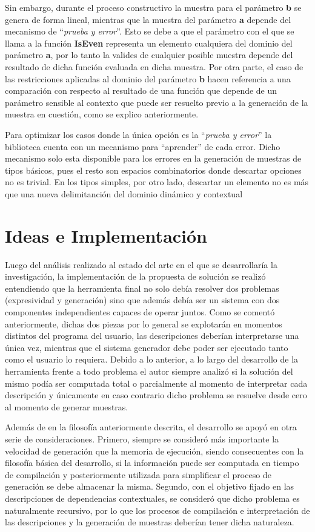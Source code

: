 Sin embargo, durante el proceso constructivo la muestra para el parámetro {\bf b} se genera de forma lineal, mientras que la
muestra del parámetro {\bf a} depende del mecanismo de “{\it prueba y error}”. Esto se debe a que el parámetro con el que se llama
a la función {\bf IsEven} representa un elemento cualquiera del dominio del parámetro {\bf a}, por lo tanto la valides de cualquier
posible muestra depende del resultado de dicha función evaluada en dicha muestra. Por otra parte, el caso de las
restricciones aplicadas al dominio del parámetro {\bf b} hacen referencia a una comparación con respecto al resultado de una
función que depende de un parámetro sensible al contexto que puede ser resuelto previo a la generación de la muestra en
cuestión, como se explico anteriormente.

Para optimizar los casos donde la única opción es la “{\it prueba y error}” la biblioteca cuenta con un mecanismo para “aprender”
de cada error. Dicho mecanismo solo esta disponible para los errores en la generación de muestras de tipos básicos, pues el
resto son espacios combinatorios donde descartar opciones no es trivial. En los tipos simples, por otro lado, descartar un
elemento no es más que una nueva delimitanción del dominio dinámico y contextual

\section{Ideas e Implementación}


Luego del análisis realizado al estado del arte en el que se desarrollaría la investigación, la implementación de
la propuesta de solución se realizó entendiendo que la herramienta final no solo debía resolver dos problemas
(expresividad y generación) sino que además debía ser un sistema con dos componentes independientes capaces de
operar juntos. Como se comentó anteriormente, dichas dos piezas por lo general se explotarán en momentos distintos
del programa del usuario, las descripciones deberían interpretarse una única vez, mientras que el sistema generador
debe poder ser ejecutado tanto como el usuario lo requiera. Debido a lo anterior, a lo largo del desarrollo de la
herramienta frente a todo problema el autor siempre analizó si la solución del mismo podía ser computada total o
parcialmente al momento de interpretar cada descripción y únicamente en caso contrario dicho problema se resuelve desde
cero al momento de generar muestras.



Además de en la filosofía anteriormente descrita, el desarrollo se apoyó en otra serie de consideraciones.
Primero, siempre se consideró más importante la velocidad de generación que la memoria de ejecución, siendo 
consecuentes con la filosofía básica del desarrollo, si la información puede ser computada en tiempo de compilación y
posteriormente utilizada para simplificar el proceso de generación se debe almacenar la misma. Segundo, con el objetivo
fijado en las descripciones de dependencias contextuales, se consideró que dicho problema es naturalmente recursivo, por
lo que los procesos de compilación e interpretación de las descripciones y la generación de muestras deberían tener
dicha naturaleza.

